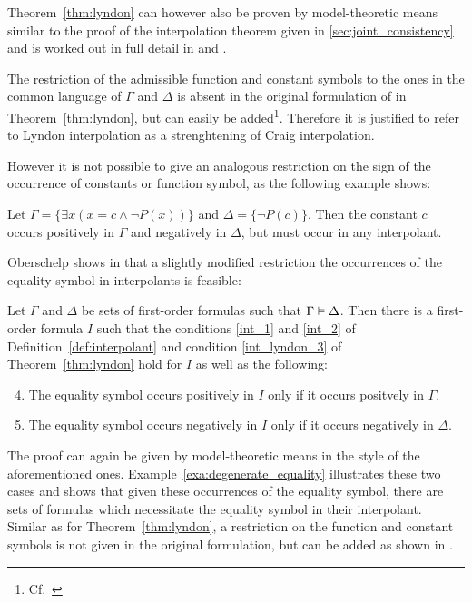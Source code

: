 Theorem~\ref{thm:lyndon} can however also be proven by model-theoretic means similar to the proof of the interpolation theorem given in \ref{sec:joint_consistency}
and is worked out in full detail in \cite{Henkin63} and \cite[Theorem\ 2.2.24]{chang1990model}.

The restriction of the admissible function and constant symbols to the ones in the common language of $\Gamma$ and $\Delta$ is absent in the original formulation of in Theorem~\ref{thm:lyndon}, but can easily be added\footnote{Cf.\ \cite{motohashi84}}.
Therefore it is justified to refer to Lyndon interpolation as a strenghtening of Craig interpolation.

However it is not possible to give an analogous restriction on the sign of the occurrence of constants or function symbol, as the following example shows: 

\begin{exa}
	Let $\Gamma = \{ \exists x ( x = c \land \lnot P(x)) \}$ and $\Delta = \{ \lnot P(c) \}$.
	Then the constant $c$ occurs positively in $\Gamma$ and negatively in $\Delta$, but must occur in any interpolant.
\end{exa}

Oberschelp shows in \cite{oberschelp68} that a slightly modified restriction the occurrences of the equality symbol in interpolants is feasible:

\begin{thm}[Oberschelp]
	\label{thm:oberschelp}
	Let $\Gamma$ and $\Delta$ be sets of first-order formulas such that $\Gamma \entails\nolinebreak \Delta$. 
	Then there is a first-order formula $I$ such that the conditions \ref{int_1} and \ref{int_2} of Definition~\ref{def:interpolant} and condition \ref{int_lyndon_3} of Theorem~\ref{thm:lyndon} hold for $I$ as well as the following:

	\begin{enumerate}[\quad\:1'.]
		\setcounter{enumi}{3}
		\item 
			The equality symbol occurs positively in $I$ only if it occurs positvely in $\Gamma$.
		\item
			The equality symbol occurs negatively in $I$ only if it occurs negatively in $\Delta$.
	\end{enumerate}
\end{thm}

The proof can again be given by model-theoretic means in the style of the aforementioned ones.
Example~\ref{exa:degenerate_equality} illustrates these two cases and shows that given these occurrences of the equality symbol, there are sets of formulas which necessitate the equality symbol in their interpolant.
Similar as for Theorem~\ref{thm:lyndon}, a restriction on the function and constant symbols is not given in the original formulation, but can be added as shown in \cite{fujiwara78}.

